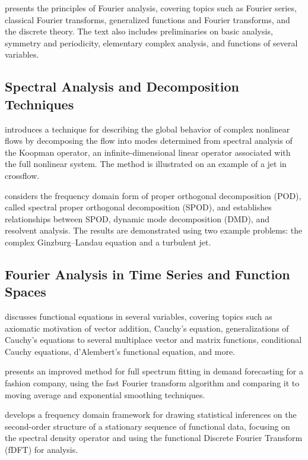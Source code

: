 \documentclass{article}
\begin{document}
\cite{Howell2001PrinciplesOF} presents the principles of Fourier analysis, covering topics such as Fourier series, classical Fourier transforms, generalized functions and Fourier transforms, and the discrete theory. The text also includes preliminaries on basic analysis, symmetry and periodicity, elementary complex analysis, and functions of several variables.

\subsection{Spectral Analysis and Decomposition Techniques}

\cite{Rowley2009SpectralAO} introduces a technique for describing the global behavior of complex nonlinear flows by decomposing the flow into modes determined from spectral analysis of the Koopman operator, an infinite-dimensional linear operator associated with the full nonlinear system. The method is illustrated on an example of a jet in crossflow.

\cite{Towne2017SpectralPO} considers the frequency domain form of proper orthogonal decomposition (POD), called spectral proper orthogonal decomposition (SPOD), and establishes relationships between SPOD, dynamic mode decomposition (DMD), and resolvent analysis. The results are demonstrated using two example problems: the complex Ginzburg–Landau equation and a turbulent jet.

\subsection{Fourier Analysis in Time Series and Function Spaces}

\cite{Aczl2008FunctionalEI} discusses functional equations in several variables, covering topics such as axiomatic motivation of vector addition, Cauchy's equation, generalizations of Cauchy's equations to several multiplace vector and matrix functions, conditional Cauchy equations, d'Alembert's functional equation, and more.

\cite{Cappellari2016ImprovingTF} presents an improved method for full spectrum fitting in demand forecasting for a fashion company, using the fast Fourier transform algorithm and comparing it to moving average and exponential smoothing techniques.

\cite{Panaretos2013FourierAO} develops a frequency domain framework for drawing statistical inferences on the second-order structure of a stationary sequence of functional data, focusing on the spectral density operator and using the functional Discrete Fourier Transform (fDFT) for analysis.
\end{document}

